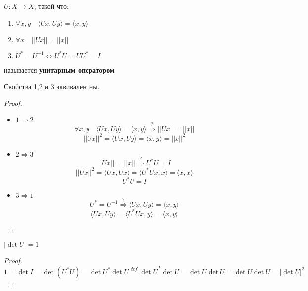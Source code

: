 

\cfoot{}

\renewcommand{\thesubsection}{\arabic{subsection}.}
\makeatletter
\renewcommand*{\@seccntformat}[1]{\csname the#1\endcsname\hspace{0.1cm}}
\makeatother




\begin{definition}
    $U : X\to X$, такой что:
    \begin{enumerate}
        \item $\forall x,y \quad \langle Ux, Uy \rangle = \langle x, y\rangle$
        \item $\forall x \quad ||Ux||=||x||$
        \item $U^* = U^{-1} \Leftrightarrow U^*U=UU^*=I$
    \end{enumerate}
    называется \textbf{унитарным оператором}
\end{definition}

\begin{theorem}
    Свойства 1,2 и 3 эквивалентны.
\end{theorem}
\begin{proof}
    \begin{itemize}
        \item $1\Rightarrow 2$
        $$\forall x,y \quad \langle Ux, Uy \rangle = \langle x, y\rangle \stackrel{?}{\Rightarrow} ||Ux||=||x||$$
        $$||Ux||^2 = \langle Ux, Uy \rangle = \langle x, y\rangle = ||x||^2$$
        \item $2\Rightarrow 3$
        $$||Ux||=||x|| \stackrel{?}{\Rightarrow} U^*U=I$$
        $$||Ux||^2 = \langle Ux, Ux \rangle = \langle U^*Ux, x \rangle = \langle x, x\rangle$$
        $$U^*U=I$$
        \item $3\Rightarrow 1$
        $$U^*=U^{-1} \stackrel{?}{\Rightarrow} \langle Ux, Uy \rangle = \langle x, y\rangle$$
        $$\langle Ux, Uy \rangle = \langle U^*Ux, y \rangle = \langle x, y\rangle$$
    \end{itemize}
\end{proof}
\begin{lemma}
    $|\det U| = 1$
\end{lemma}
\begin{proof}
    $$1 = \det I = \det(U^*U)=\det U^* \det U \stackrel{def}{=} \det \overline U^T \det U = \det \overline U \det U=\overline {\det U} \det U = |\det U|^2$$
\end{proof}

